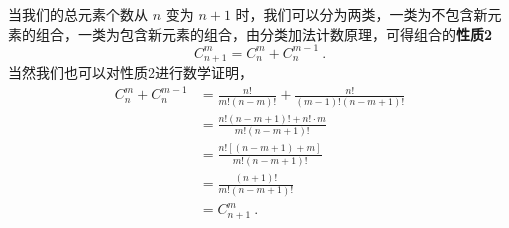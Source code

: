 当我们的总元素个数从 $n$ 变为 $n+1$ 时，我们可以分为两类，一类为不包含新元素的组合，一类为包含新元素的组合，由分类加法计数原理，可得组合的\textbf{性质2}
\begin{equation}
C_{n + 1}^m = C_n^m + C_n^{m - 1}~.
\end{equation}
当然我们也可以对性质2进行数学证明，
\begin{equation}
\begin{aligned}
C_n^m + C_n^{m - 1} &= \frac{n!}{m!(n-m)!} + \frac{n!}{(m - 1)!(n - m + 1)!}\\
&=\frac{n!(n - m + 1)! + n!\cdot m}{m!(n - m + 1)!}\\
&=\frac{n![(n - m + 1) + m]}{m!(n - m + 1)!}\\
&=\frac{(n + 1)!}{m!(n - m + 1)!}\\
&=C_{n+1}^m~.
\end{aligned}
\end{equation}
